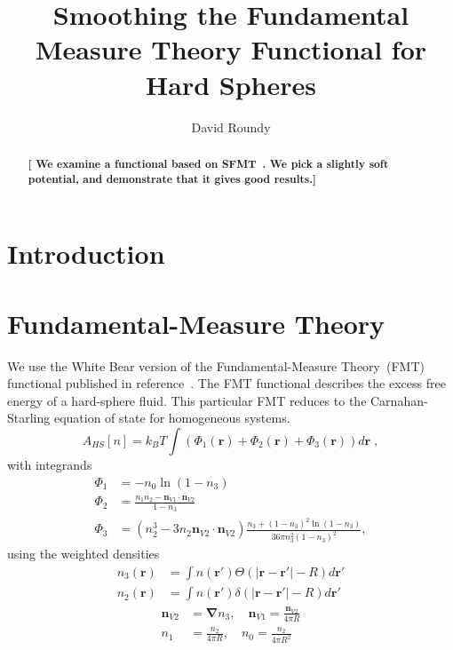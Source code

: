 \documentclass[letterpaper,twocolumn,amsmath,amssymb,prb]{revtex4-1}
\newcommand{\red}[1]{{\bf \color{red} #1}}
\newcommand{\rr}{\textbf{r}}
\newcommand{\fixme}[1]{\red{[#1]}}
\begin{document}
\title{Smoothing the Fundamental Measure Theory Functional for Hard Spheres}

\author{David Roundy}

\begin{abstract}
\fixme{ We examine a functional based on SFMT~\cite{schmidt2000fluid}.
  We pick a slightly soft potential, and demonstrate that it gives
  good results.}
\end{abstract}

\maketitle

\section{Introduction}



\section{Fundamental-Measure Theory}

We use the White Bear version of the Fundamental-Measure Theory~(FMT)
functional published in reference~\cite{roth2002whitebear}.  The FMT
functional describes the excess free energy of a hard-sphere fluid.
This particular FMT reduces to the Carnahan-Starling equation of state
for homogeneous systems.
\begin{equation}
A_\textit{HS}[n] = k_B T \int \left(\Phi_1(\rr) + \Phi_2(\rr) + \Phi_3(\rr)\right) d\rr \; ,
\end{equation}
with integrands
\begin{align}
\Phi_1 &= -n_0 \ln\left( 1 - n_3\right)\\
\Phi_2 &= \frac{n_1 n_2 - \mathbf{n}_{V1} \cdot\mathbf{n}_{V2}}{1-n_3} \\
\Phi_3 &= (n_2^3 - 3 n_2 \mathbf{n}_{V2} \cdot \mathbf{n}_{V2}) \frac{
  n_3 + (1-n_3)^2 \ln(1-n_3)
}{
  36\pi n_3^2\left( 1 - n_3 \right)^2
} ,
\end{align}
using the weighted densities
\begin{align}
  n_3(\rr) &= \int n(\rr') \Theta(\left|\rr - \rr'\right| - R) d\rr' \\
  n_2(\rr) &= \int n(\rr') \delta(\left|\rr - \rr'\right| - R) d\rr'
\end{align}
\begin{align}
  \mathbf{n}_{V2} &= \mathbf{\nabla} n_3 , \quad
  \mathbf{n}_{V1} = \frac{\mathbf{n}_{V2}}{4\pi R} \\
  n_1 &= \frac{n_2}{4\pi R} , \quad
  n_0 = \frac{n_2}{4\pi R^2}
\end{align}
\end{document}
